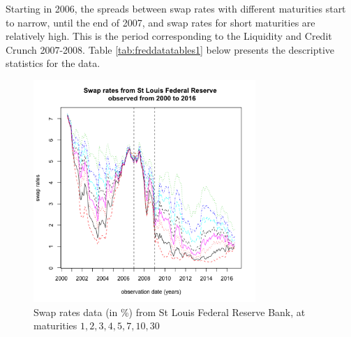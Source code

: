 \medskip

Starting in 2006, the spreads between swap rates with different maturities start to narrow, until the end of 2007, and swap rates for short maturities are relatively high. This is the period corresponding to the Liquidity and Credit Crunch 2007-2008. Table \ref{tab:freddatatables1} below presents the descriptive statistics for the data. 


\begin{figure}[!htb]
\centering
  \includegraphics[width=0.75\textwidth]{gfx/chapter-yc-insurance/forecasting_graph6}
\caption{Swap rates data (in \%) from St Louis Federal Reserve Bank, at maturities $1, 2, 3, 4, 5, 7, 10, 30$}
\label{forecast:6}       %
\end{figure}


